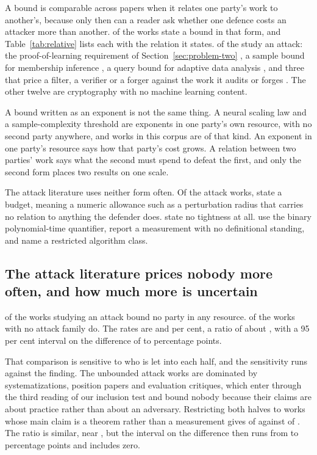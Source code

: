 A bound is comparable across papers when it relates one party's work to another's,
because only then can a reader ask whether one defence costs an attacker more than
another. \NumRelative{} of the \NumSources{} works state a bound in that form, and
Table~\ref{tab:relative} lists each with the relation it states.
\NumRelativeAttack{} of the \NumRelative{} study an attack: the proof-of-learning
requirement of Section~\ref{sec:problem-two} \cite{JYCDTCP21}, a sample bound for
membership inference \cite{HSU25}, a query bound for adaptive data analysis
\cite{HU14}, and three that price a filter, a verifier or a forger against the work
it audits or forges \cite{BGGKRR26,NK26,ZCSL24}. The other twelve are cryptography
with no machine learning content.



A bound written as an exponent is not the same thing. A neural scaling law and a
sample-complexity threshold are exponents in one party's own resource, with no
second party anywhere, and \NumExponent{} works in this corpus are of that kind. An
exponent in one party's resource says how that party's cost grows. A relation
between two parties' work says what the second must spend to defeat the first, and
only the second form places two results on one scale.

The attack literature uses neither form often. Of the \NumAttackWorks{} attack
works, \AttackBudget{} state a budget, meaning a numeric allowance such as a
perturbation radius that carries no relation to anything the defender does.
\AttackUnstated{} state no tightness at all. \AttackPoly{} use the binary
polynomial-time quantifier, \AttackMeasured{} report a measurement with no
definitional standing, and \AttackClass{} name a restricted algorithm class.

\subsection{The attack literature prices nobody more often, and how much more is uncertain}

\AttackUnbound{} of the \NumAttackWorks{} works studying an attack bound no party
in any resource. \TheoryUnbound{} of the \NumTheoryWorks{} works with no attack
family do. The rates are \RateAttack{} and \RateOther{} per cent, a ratio of about
\RatioUnbound{}, with a 95 per cent interval on the difference of \DiffLo{} to
\DiffHi{} percentage points.

That comparison is sensitive to who is let into each half, and the sensitivity runs
against the finding. The unbounded attack works are dominated by systematizations,
position papers and evaluation critiques, which enter through the third reading of
our inclusion test and bound nobody because their claims are about practice rather
than about an adversary. Restricting both halves to works whose main claim is a
theorem rather than a measurement gives \ThmAttackUnbound{} of \ThmAttack{}
against \ThmOtherUnbound{} of \ThmOther{}. The ratio is similar, near \ThmRatio{},
but the interval on the difference then runs from \ThmDiffLo{} to \ThmDiffHi{}
percentage points and includes zero.

